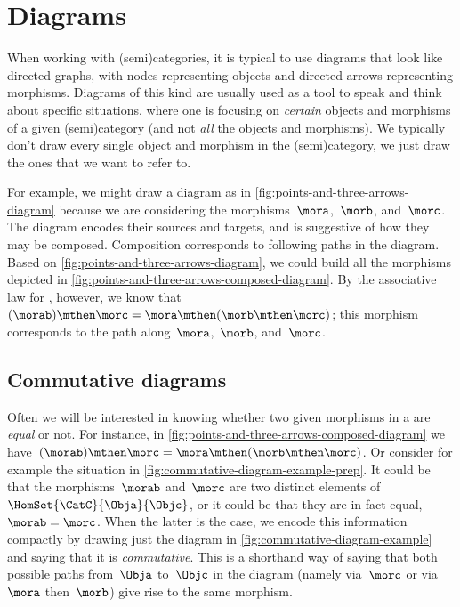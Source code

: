 
\section{Diagrams}

When working with (semi)categories, it is typical to use diagrams that look like directed graphs, with nodes representing objects and directed arrows representing morphisms.
Diagrams of this kind are usually used as a tool to speak and think about specific situations, where one is focusing on \emph{certain} objects and morphisms of a given (semi)category (and not \emph{all} the objects and morphisms).
We typically don't draw every single object and morphism in the (semi)category, we just draw the ones that we want to refer to.

\begin{marginfigure}
    \centering
    \caption{}
    \label{fig:points-and-three-arrows-diagram}
\end{marginfigure}

\begin{marginfigure}
    \centering
    \caption{}
    \label{fig:points-and-three-arrows-composed-diagram}
\end{marginfigure}

For example, we might draw a diagram as in \cref{fig:points-and-three-arrows-diagram} because we are considering the morphisms~$\mora$,~$\morb$, and~$\morc$.
The diagram encodes their sources and targets, and is suggestive of how they may be composed.
Composition corresponds to following paths in the diagram.
Based on \cref{fig:points-and-three-arrows-diagram}, we could build all the morphisms depicted in \cref{fig:points-and-three-arrows-composed-diagram}.
By the associative law for , however, we know that~$(\morab) \mthen \morc = \mora \mthen (\morb \mthen \morc)$;
this morphism corresponds to the path along~$\mora$,~$\morb$, and~$\morc$.

\subsection{Commutative diagrams}

Often we will be interested in knowing whether two given morphisms in a  are \emph{equal} or not.
For instance, in \cref{fig:points-and-three-arrows-composed-diagram} we have~$(\morab) \mthen \morc = \mora \mthen (\morb \mthen \morc)$.
Or consider for example the situation in \cref{fig:commutative-diagram-example-prep}.
It could be that the morphisms~$\morab$ and~$\morc$ are two distinct elements of~$\HomSet{\CatC}{\Obja}{\Objc}$, or it could be that they are in fact equal,~$\morab = \morc$.
When the latter is the case, we encode this information compactly by drawing just the diagram in \cref{fig:commutative-diagram-example} and saying that it is \emph{commutative}.
This is a shorthand way of saying that both possible paths from~$\Obja$ to~$\Objc$ in the diagram (namely via~$\morc$ or via~$\mora$ then~$\morb$) give rise to the same morphism.

